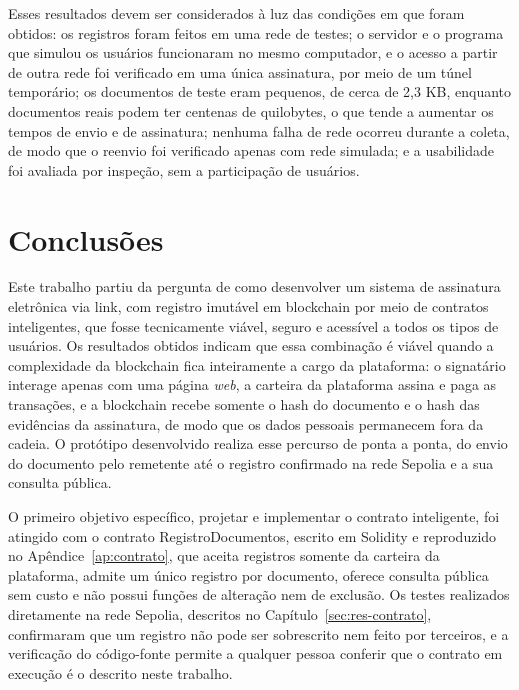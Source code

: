 \documentclass[
    12pt,
    a4paper,
    oneside,
    chapter=TITLE,
    section=TITLE,
    subsection=TITLE,
    subsubsection=TITLE,
    sumario=tradicional,
    english,
    brazil
]{abntex2}
\begin{document}
Esses resultados devem ser considerados à luz das condições em que foram obtidos: os registros foram feitos em uma rede de testes; o servidor e o programa que simulou os usuários funcionaram no mesmo computador, e o acesso a partir de outra rede foi verificado em uma única assinatura, por meio de um túnel temporário; os documentos de teste eram pequenos, de cerca de 2,3 KB, enquanto documentos reais podem ter centenas de quilobytes, o que tende a aumentar os tempos de envio e de assinatura; nenhuma falha de rede ocorreu durante a coleta, de modo que o reenvio foi verificado apenas com rede simulada; e a usabilidade foi avaliada por inspeção, sem a participação de usuários.

\chapter{Conclusões}

Este trabalho partiu da pergunta de como desenvolver um sistema de assinatura eletrônica via link, com registro imutável em blockchain por meio de contratos inteligentes, que fosse tecnicamente viável, seguro e acessível a todos os tipos de usuários. Os resultados obtidos indicam que essa combinação é viável quando a complexidade da blockchain fica inteiramente a cargo da plataforma: o signatário interage apenas com uma página \emph{web}, a carteira da plataforma assina e paga as transações, e a blockchain recebe somente o hash do documento e o hash das evidências da assinatura, de modo que os dados pessoais permanecem fora da cadeia. O protótipo desenvolvido realiza esse percurso de ponta a ponta, do envio do documento pelo remetente até o registro confirmado na rede Sepolia e a sua consulta pública.

O primeiro objetivo específico, projetar e implementar o contrato inteligente, foi atingido com o contrato RegistroDocumentos, escrito em Solidity e reproduzido no Apêndice~\ref{ap:contrato}, que aceita registros somente da carteira da plataforma, admite um único registro por documento, oferece consulta pública sem custo e não possui funções de alteração nem de exclusão. Os testes realizados diretamente na rede Sepolia, descritos no Capítulo~\ref{sec:res-contrato}, confirmaram que um registro não pode ser sobrescrito nem feito por terceiros, e a verificação do código-fonte permite a qualquer pessoa conferir que o contrato em execução é o descrito neste trabalho.
\end{document}
